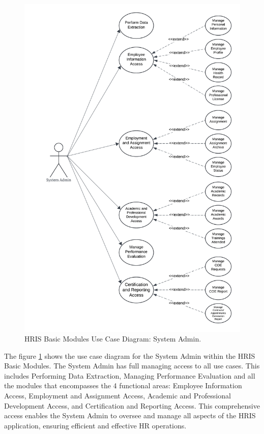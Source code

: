     \begin{figure}[H]
        \centering
        \includegraphics[width=0.9\linewidth]{figures/images/use-case-basic-1.png}
        \caption{HRIS Basic Modules Use Case Diagram: System Admin.}
        \label{fig:use-case-basic-1}
    \end{figure}

    The figure \ref{fig:use-case-basic-1} shows the use case diagram for the System Admin within the HRIS Basic Modules. The System Admin has full managing access to all use cases. This includes Performing Data Extraction, Managing Performance Evaluation and all the modules that encompasses the 4 functional areas: Employee Information Access, Employment and Assignment Access, Academic and Professional Development Access, and Certification and Reporting Access. This comprehensive access enables the System Admin to oversee and manage all aspects of the HRIS application, ensuring efficient and effective HR operations.

